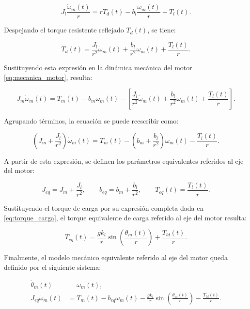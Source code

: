 \documentclass[10pt,a4paper]{article}
\begin{document}
\begin{equation*}
    J_l \frac{\dot{\omega}_m(t)}{r} = r T_d(t) - b_l \frac{\omega_m(t)}{r} - T_l(t).
\end{equation*}

Despejando el torque resistente reflejado $T_d(t)$, se tiene:

\begin{equation*}
    T_d(t) = \frac{J_l}{r^2}\dot{\omega}_m(t) + \frac{b_l}{r^2}\omega_m(t) + \frac{T_l(t)}{r}.
\end{equation*}

Sustituyendo esta expresión en la dinámica mecánica del motor \eqref{eq:mecanica_motor}, resulta:

\begin{equation*}
    J_m \dot{\omega}_m(t) = T_m(t) - b_m \omega_m(t) - \left[ \frac{J_l}{r^2}\dot{\omega}_m(t) + \frac{b_l}{r^2}\omega_m(t) + \frac{T_l(t)}{r} \right].
\end{equation*}

Agrupando términos, la ecuación se puede reescribir como:

\begin{equation*}
    \left( J_m + \frac{J_l}{r^2} \right) \dot{\omega}_m(t) = T_m(t) - \left( b_m + \frac{b_l}{r^2} \right) \omega_m(t) - \frac{T_l(t)}{r}.
\end{equation*}

A partir de esta expresión, se definen los parámetros equivalentes referidos al eje del motor:

\begin{equation*}
    J_{eq} = J_m + \frac{J_l}{r^2}, \qquad b_{eq} = b_m + \frac{b_l}{r^2}, \qquad T_{eq}(t) = \frac{T_l(t)}{r}.
\end{equation*}

Sustituyendo el torque de carga por su expresión completa dada en \eqref{eq:torque_carga}, el torque equivalente de carga referido al eje del motor resulta:

\begin{equation*}
    T_{eq}(t) = \frac{g k_l}{r} \sin\left(\frac{\theta_m(t)}{r}\right) + \frac{T_{ld}(t)}{r}.
\end{equation*}

Finalmente, el modelo mecánico equivalente referido al eje del motor queda definido por el siguiente sistema:

\begin{equation}
    \begin{aligned}
        \dot{\theta}_m(t) &= \omega_m(t), \\
        J_{eq}\dot{\omega}_m(t) &= T_m(t) - b_{eq}\omega_m(t) - \frac{g k_l}{r} \sin\left(\frac{\theta_m(t)}{r}\right) - \frac{T_{ld}(t)}{r}.
    \end{aligned}
    \label{eq:modelo_mecanico_final}
\end{equation}
\end{document}
